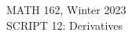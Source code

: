 \documentclass[10pt]{article}
\renewcommand{\_}[1]{\underline{ #1 }}
\newcommand{\head}[1]{
	\begin{center}
		{\large #1}
		\vspace{.2 in}
	\end{center}
	
	\bigskip 
}
\theoremstyle{definition}
\numberwithin{equation}{subsection}
\begin{document}
	
\head{MATH 162, Winter 2023\\
SCRIPT 12: Derivatives}

\setcounter{section}{12} 
\end{document}
